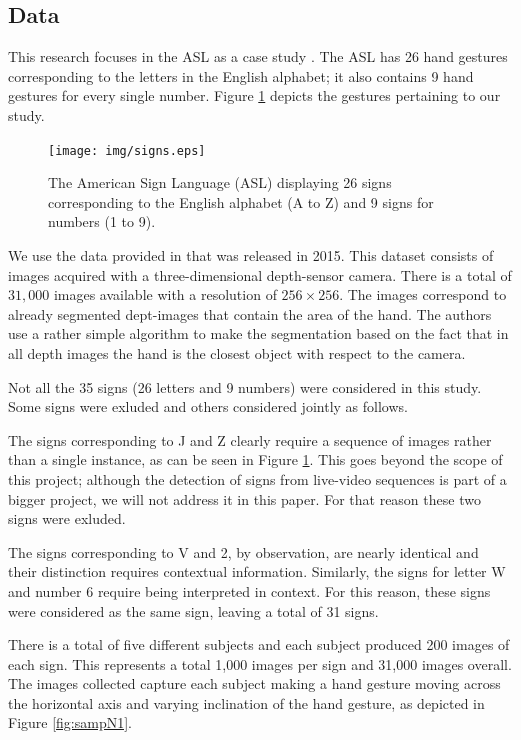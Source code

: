 \documentclass[a4paper]{article}
\begin{document}
\subsection{Data}

This research focuses in the ASL as a case study \cite{baker1980american}. 
The ASL has 26 hand gestures 
corresponding to the letters in the English alphabet; it also contains 9 hand
gestures for every single number. Figure \ref{fig:asl} 
depicts the gestures pertaining to our study.

\begin{figure}
\centering
\texttt{[image: img/signs.eps]}
\caption{The American Sign Language (ASL) displaying 26 signs corresponding to the
English alphabet (A to Z) and 9 signs for numbers (1 to 9).}
\label{fig:asl}
\end{figure}

We use the data provided in \cite{kang2015real} that was released in 2015. This
dataset consists of images acquired with a three-dimensional depth-sensor camera. 
There is a total of $31,000$ images available with a resolution of $256 \times
256$. The images correspond to already segmented dept-images that contain the
area of the hand. The authors use a rather simple algorithm to make the
segmentation based on the fact that in all depth images the hand is the closest
object with respect to the camera. 

Not all the 35 signs (26 letters and 9 numbers) 
were considered in this study. Some signs
were exluded and others considered jointly as follows.

The signs corresponding to J and Z clearly require a sequence of images rather
than a single instance, as can be seen in Figure \ref{fig:asl}. This goes
beyond the scope of this project; although the detection of signs from
live-video sequences is part of a bigger project, we will not address it in this
paper. For that reason these two signs were exluded.

The signs corresponding to V and 2, by observation, are nearly identical and
their distinction requires contextual information. Similarly, the signs for
letter W and number 6 require being interpreted in context. 
For this reason, these signs were considered as the same sign, leaving a total
of 31 signs.

There is a total of five different 
subjects and each subject produced 200 images of each
sign. This represents a total 1,000 images per sign and 31,000 images overall.
The images collected capture each subject making a hand gesture moving across
the horizontal axis and varying inclination of the hand gesture, as depicted in
Figure \ref{fig:sampN1}.
\end{document}
